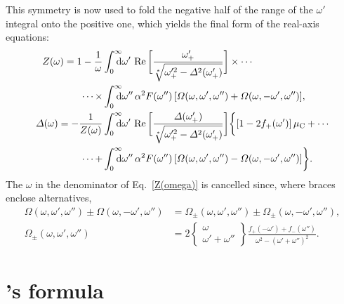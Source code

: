 This symmetry is now used to fold the negative half of the range of the
$\omega'$ integral onto the positive one, which yields the final form of the
real-axis  equations:
%
\begin{subequations} \label{real-axis Eliashberg equations}
    \begin{align} \notag
        Z(\omega) = 1 - \frac 1 \omega
        &\int \from 0 \till \infty \D \omega' \,
        \Re \bigg[
            \frac{\omega'_+}{\sqrt[*]{\omega'^2_+ - \Delta^2(\omega'_+)}}
        \bigg]
        \times \cdots
        \\ \label{Z(omega)}
        \cdots \times
        &\int \from 0 \till \infty \D \omega'' \, \alpha^2 F(\omega'') \,
        [ \Omega(\omega,  \omega', \omega'')
        + \Omega(\omega, -\omega', \omega'') ],
        \\ \notag
        \Delta(\omega) = -\frac 1 {Z(\omega)}
        &\int \from 0 \till \infty \D \omega' \,
        \Re \bigg[ \frac
            {\Delta(\omega'_+)}
            {\sqrt[*]{\omega'^2_+ - \Delta^2(\omega'_+)}}
        \bigg]
        \bigg \{
            [1 - 2 f_+(\omega')] \, \mu \sub C
            + \cdots
            \\
            \cdots +
            &\int \from 0 \till \infty \D \omega'' \, \alpha^2 F(\omega'') \,
            [ \Omega(\omega,  \omega', \omega'')
            - \Omega(\omega, -\omega', \omega'') ]
        \bigg \}.
    \end{align}
\end{subequations}
%
The $\omega$ in the denominator of Eq.~\ref{Z(omega)} is cancelled since, where
braces enclose alternatives,
%
\begin{align*}
    \Omega    (\omega,  \omega', \omega'') \pm
    \Omega    (\omega, -\omega', \omega'') &=
    \Omega_\pm(\omega,  \omega', \omega'') \pm
    \Omega_\pm(\omega, -\omega', \omega''),
    \\
    \Omega_\pm(\omega,  \omega', \omega'') &=
    2 \begin{Bmatrix} \omega \\ \omega' + \omega'' \end{Bmatrix}
    \frac{f_+(-\omega') + f_-(\omega'')}{\omega^2 -(\omega' + \omega'')^2}.
\end{align*}

\section{'s formula}

